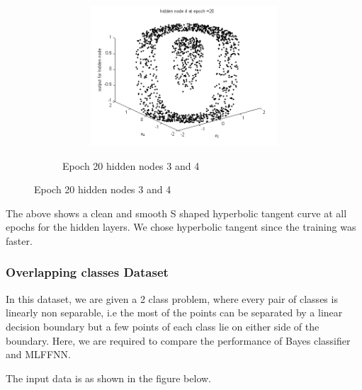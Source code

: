 \documentclass{article}
\begin{document}
\begin{figure}
\begin{figure}
\begin{subfigure}{.5\textwidth}
\end{subfigure}%
\begin{subfigure}{.5\textwidth}
  \centering
  \includegraphics[width=.8\linewidth]{Classification/nonlinearlySeparable/h20_4}
  \end{subfigure}
\caption{Epoch 20 hidden nodes 3 and 4}
\end{figure}
\end{figure}
The above shows a clean and smooth S shaped hyperbolic tangent curve at all epochs for the hidden layers. We chose hyperbolic tangent since the training was faster.
\newpage
\subsubsection{Overlapping classes Dataset}
\begin{flushleft}
In this dataset, we are given a 2 class problem, where every pair of classes is linearly non separable, i.e the most of the points can be separated by a linear decision boundary but a few points of each class lie on either side of the boundary. Here, we are required to compare the performance of Bayes classifier and MLFFNN.

The input data is as shown in the figure below. \\[10pt]
\end{flushleft}
\end{document}
